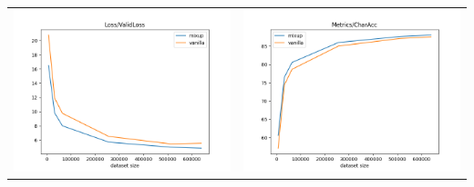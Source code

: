 \begin{longtable}{cc}
\centering
\includegraphics[scale=0.4]{./images/mixup_size/all/ValidLoss.png} & \includegraphics[scale=0.4]{./images/mixup_size/all/CharAcc.png}\\

\end{longtable}
